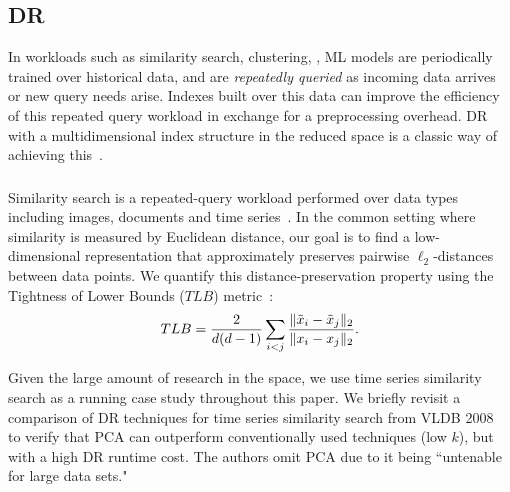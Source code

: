 \subsection{DR }

In workloads such as similarity search, clustering, , ML models are periodically trained over historical data, and are \emph{repeatedly queried} as incoming data arrives or new query needs arise. 
Indexes built over this data can improve the efficiency of this repeated query workload in exchange for a preprocessing overhead.
DR with a multidimensional index structure in the reduced space is a classic way of achieving this~\cite{local-dr,dynamic-ss,dm-book,humming-index,decade,search}.


\subsubsection*{}
Similarity search is a repeated-query workload performed over data types including images, documents and time series~\cite{keogh-study,lsh}.
In the common setting where similarity is measured by Euclidean distance, our goal is to find a low-dimensional representation that approximately preserves pairwise $\ell_2$-distances between data points. We quantify this distance-preservation property using the Tightness of Lower Bounds ($TLB$) metric~\cite{keogh-study}:  
\begin{equation}
\label{eq:tlb}
TLB = \frac{2}{{\color{black}d}({\color{black}d}-1)}\sum_{i<j}\frac{\| \tilde{x}_i -  \tilde{x}_j \|_2 }{\| x_i -  x_j\|_2 }.
\end{equation}

Given the large amount of research in the space, we use time series similarity search as a running case study throughout this paper. 
We briefly revisit a comparison of DR techniques for time series similarity search from VLDB 2008~\cite{keogh-study} to verify that PCA can outperform conventionally used techniques (low $k$), but with a high DR runtime cost.
The authors omit PCA due to it being ``untenable for large data sets." 

